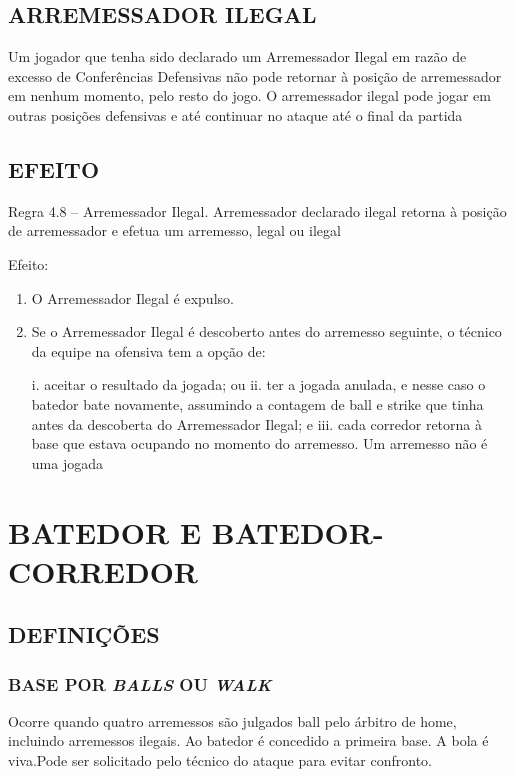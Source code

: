 \section{ARREMESSADOR ILEGAL}
 Um jogador que tenha sido declarado um Arremessador Ilegal em razão de excesso de Conferências Defensivas não pode retornar à posição de arremessador em nenhum momento, pelo resto do jogo. O arremessador ilegal pode jogar em outras posições defensivas e até continuar no ataque até o final da partida

\section*{EFEITO}

Regra 4.8 -- Arremessador Ilegal. Arremessador declarado ilegal retorna à posição de arremessador e efetua um arremesso, legal ou ilegal

 Efeito:
	\begin{enumerate}[label=(\alph*)]\item   O Arremessador Ilegal é expulso.
	\item  Se o Arremessador Ilegal é descoberto antes do arremesso seguinte, o	técnico da equipe na ofensiva tem a opção de:

	 i. aceitar o resultado da jogada; ou
	 ii. ter a jogada anulada, e nesse caso o batedor bate novamente, assumindo a
	 contagem de \gls{ball} e \gls{strike} que tinha antes da descoberta do Arremessador
	 Ilegal; e
	 iii. cada corredor retorna à base que estava ocupando no momento do arremesso. Um arremesso não é uma jogada

\end{enumerate}

\chapter{BATEDOR E BATEDOR-CORREDOR}
\minitoc%

\section{DEFINIÇÕES}

\subsection{BASE POR \textit{BALLS} OU \textit{WALK}}
 Ocorre quando quatro arremessos são julgados \gls{ball} pelo árbitro de \gls{home}, incluindo arremessos ilegais. Ao batedor é concedido a primeira base. A bola é viva.Pode ser solicitado pelo técnico do ataque para evitar confronto.

